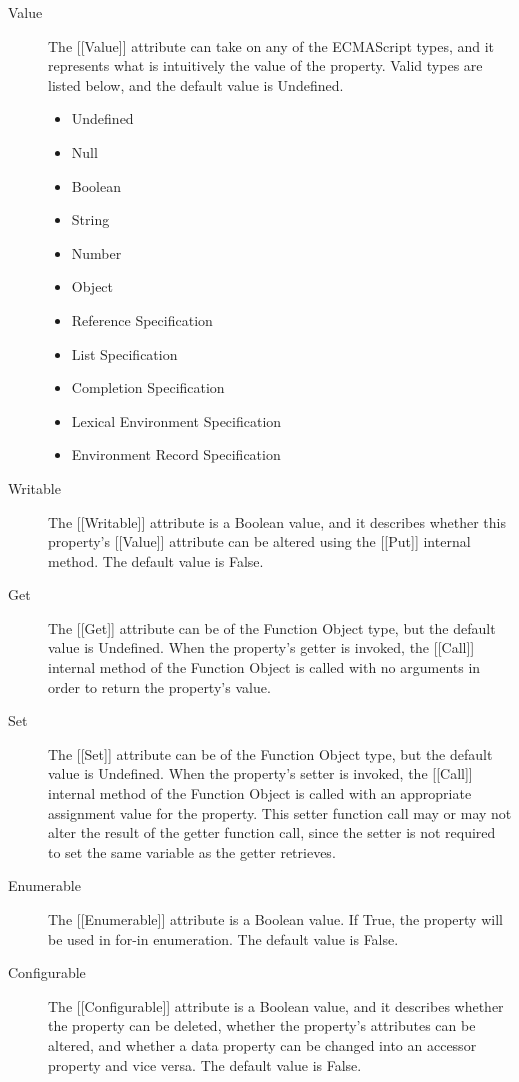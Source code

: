 \documentclass[a4paper,11pt,twoside]{report}
\begin{document}
\begin{description}
\item[Value] The [[Value]] attribute can take on any of the ECMAScript types, and it represents what is intuitively the value of the property. Valid types are listed below, and the default value is Undefined.
\begin{multicols}{2}
\begin{itemize}
	\item Undefined
	\item Null
	\item Boolean
	\item String
	\item Number
	\item Object
	\item Reference Specification
	\item List Specification
	\item Completion Specification
	\item Lexical Environment Specification
	\item Environment Record Specification
\end{itemize}
\end{multicols}

\item[Writable] The [[Writable]] attribute is a Boolean value, and it describes whether this property's [[Value]] attribute can be altered using the [[Put]] internal method. The default value is False.

\item[Get] The [[Get]] attribute can be of the Function Object type, but the default value is Undefined. When the property's getter is invoked, the [[Call]] internal method of the Function Object is called with no arguments in order to return the property's value.

\item[Set] The [[Set]] attribute can be of the Function Object type, but the default value is Undefined. When the property's setter is invoked, the [[Call]] internal method of the Function Object is called with an appropriate assignment value for the property. This setter function call may or may not alter the result of the getter function call, since the setter is not required to set the same variable as the getter retrieves.

\item[Enumerable] The [[Enumerable]] attribute is a Boolean value. If True, the property will be used in for-in enumeration. The default value is False.

\item[Configurable] The [[Configurable]] attribute is a Boolean value, and it describes whether the property can be deleted, whether the property's attributes can be altered, and whether a data property can be changed into an accessor property and vice versa. The default value is False.
\end{description}
\end{document}
